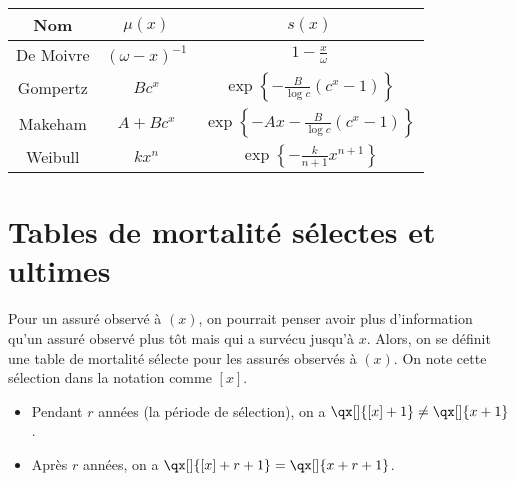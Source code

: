 \begin{center}
	\begin{tabular}{ccc}
		\hline
		Nom    &      $\mu(x)$       & $s(x)$ \\ \hline
		De Moivre & $(\omega - x)^{-1}$ &   $\displaystyle 1 - \frac{x}{\omega}$     \\
		Gompertz  &       $ Bc^x$       &   $\displaystyle \exp\left\{-\frac{B}{\log c}(c^x - 1)\right\}$     \\
		Makeham  &     $ A + Bc^x$     &   $\displaystyle \exp\left\{-Ax - \frac{B}{\log c}(c^x - 1)\right\}$     \\
		Weibull  &       $kx^n$        &   $\displaystyle \exp\left\{-\frac{k}{n+1}x^{n+1}\right\}$     \\ \hline
	\end{tabular}
\end{center}


\section{Tables de mortalité sélectes et ultimes}

Pour un assuré observé à $(x)$, on pourrait penser avoir plus d'information qu'un assuré observé plus tôt mais qui a survécu jusqu'à $x$. Alors, on se définit une table de mortalité sélecte pour les assurés observés à $(x)$. On note cette sélection dans la notation comme $[x]$. 
\begin{itemize}
	\item Pendant $r$ années (la période de sélection), on a $\qx[]{[x] + 1} \neq \qx[]{x + 1}$. 
	\item Après $r$ années, on a $\qx[]{[x] + r + 1} = \qx[]{x + r + 1}$.
\end{itemize}









